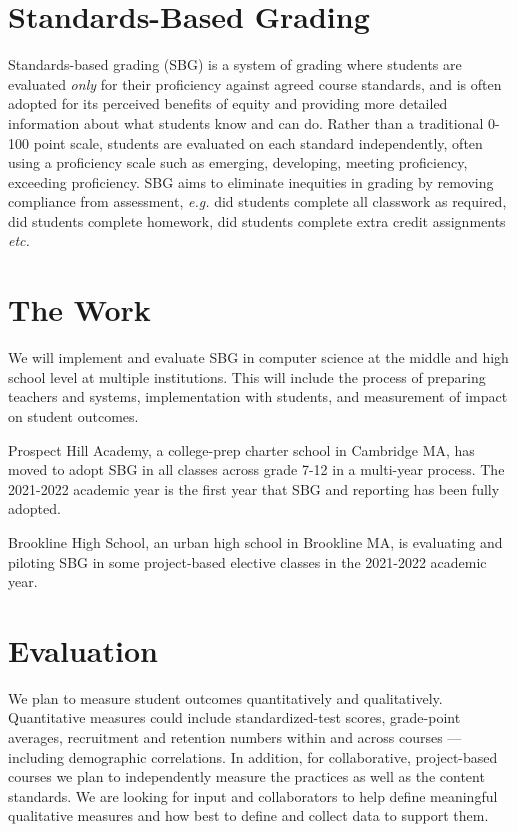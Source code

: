 \documentclass[sigconf]{acmart}
\begin{document}
\section{Standards-Based Grading}

Standards-based grading (SBG)\cite{book:grading-for-equity}\cite{book:standards-based-learning} is a system of grading where students are evaluated \textit{only} for their proficiency against agreed course standards, and is often adopted for its perceived benefits of equity and providing more detailed information about what students know and can do. Rather than a traditional 0-100 point scale, students are evaluated on each standard independently, often using a proficiency scale such as emerging, developing, meeting proficiency, exceeding proficiency. SBG aims to eliminate inequities in grading by removing compliance from assessment, \textit{e.g.} did students complete all classwork as required, did students complete homework, did students complete extra credit assignments \textit{etc.}

\section{The Work}

We will implement and evaluate SBG in computer science at the middle and high school level at multiple institutions. This will include the process of preparing teachers and systems, implementation with students, and measurement of impact on student outcomes.

Prospect Hill Academy, a college-prep charter school in Cambridge MA, has moved to adopt SBG in all classes across grade 7-12 in a multi-year process. The 2021-2022 academic year is the first year that SBG and reporting has been fully adopted. 

Brookline High School, an urban high school in Brookline MA, is evaluating and piloting SBG in some project-based elective classes in the 2021-2022 academic year.

\section{Evaluation}

We plan to measure student outcomes quantitatively and qualitatively. Quantitative measures could include standardized-test scores, grade-point averages, recruitment and retention numbers within and across courses --- including demographic correlations. In addition, for collaborative, project-based courses we plan to independently measure the practices as well as the content standards. We are looking for input and collaborators to help define meaningful qualitative measures and how best to define and collect data to support them.
\end{document}
